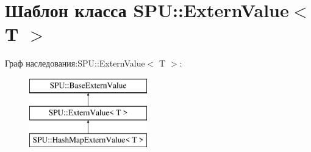 \hypertarget{class_s_p_u_1_1_extern_value}{}\section{Шаблон класса S\+PU\+:\+:Extern\+Value$<$ T $>$}
\label{class_s_p_u_1_1_extern_value}
Граф наследования\+:S\+PU\+:\+:Extern\+Value$<$ T $>$\+:\begin{figure}[H]
\begin{center}
\leavevmode
\includegraphics[height=3.000000cm]{class_s_p_u_1_1_extern_value}
\end{center}
\end{figure}
